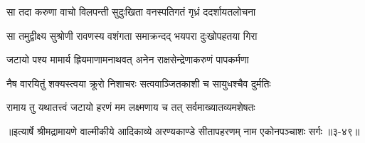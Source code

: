 \twolineshloka
{सा तदा करुणा वाचो विलपन्ती सुदुःखिता}
{वनस्पतिगतं गृध्रं ददर्शायतलोचना} %

\twolineshloka
{सा तमुद्वीक्ष्य सुश्रोणी रावणस्य वशंगता}
{समाक्रन्दद् भयपरा दुःखोपहतया गिरा} %

\twolineshloka
{जटायो पश्य मामार्य ह्रियमाणामनाथवत्}
{अनेन राक्षसेन्द्रेणाकरुणं पापकर्मणा} %

\twolineshloka
{नैष वारयितुं शक्यस्त्वया क्रूरो निशाचरः}
{सत्ववाञ्जितकाशी च सायुधश्चैव दुर्मतिः} %

\twolineshloka
{रामाय तु यथातत्त्वं जटायो हरणं मम}
{लक्ष्मणाय च तत् सर्वमाख्यातव्यमशेषतः} %


॥इत्यार्षे श्रीमद्रामायणे वाल्मीकीये आदिकाव्ये अरण्यकाण्डे सीतापहरणम् नाम एकोनपञ्चाशः सर्गः ॥३-४९॥
